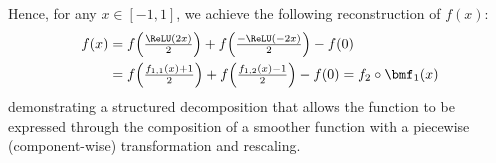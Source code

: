 \documentclass[review,hidelinks,onefignum,onetabnum]{siamart250211}
\begin{document}
Hence, for any $x\in [-1,1]$, we achieve the following reconstruction of $f(x)$:
\begin{equation*}
	\begin{split}
	    f(x)&=f\Big(\tfrac{\ReLU(2x)}{2}\Big)+ f\Big(\tfrac{-\ReLU(-2x)}{2}\Big)-f(0)
     \\& =f\Big(\tfrac{f_{1,1}(x)+1}{2}\Big)+ f\Big(\tfrac{f_{1,2}(x)-1}{2}\Big)-f(0)
 =
 f_2\circ \bmf_1(x)
	\end{split}
\end{equation*}
demonstrating a structured decomposition that allows the function to be expressed through the composition of a smoother function with a piecewise (component-wise) transformation and rescaling.
\end{document}
